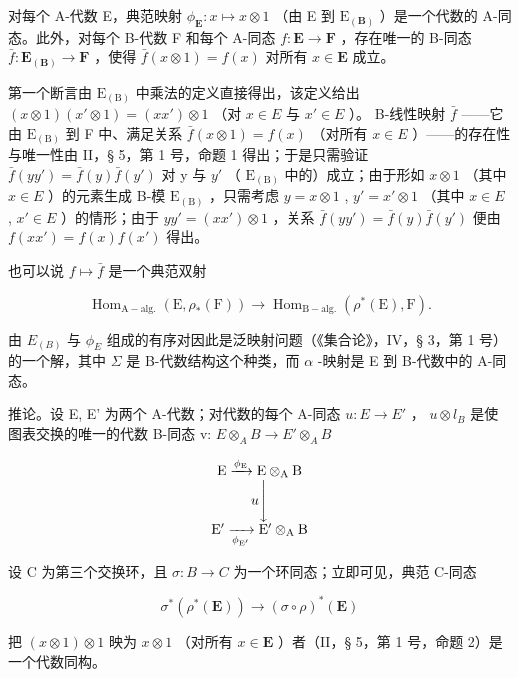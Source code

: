对每个 A-代数 E，典范映射 \(\phi_{\mathbf{E}}: x \mapsto x \otimes 1\) （由 E 到 \(\mathrm{E}_{(\mathbf{B})}\) ）是一个代数的 A-同态。此外，对每个 B-代数 F 和每个 A-同态 \(f: \mathbf{E} \to \mathbf{F}\) ，存在唯一的 B-同态 \(\bar{f}: \mathbf{E}_{(\mathbf{B})} \to \mathbf{F}\) ，使得 \(\bar{f}(x \otimes 1) = f(x)\) 对所有 \(x \in \mathbf{E}\) 成立。

第一个断言由 \(\mathrm{E}_{(\mathrm{B})}\) 中乘法的定义直接得出，该定义给出 \((x\otimes1)(x'\otimes1)=(xx')\otimes1\) （对 \(x\in E\) 与 \(x'\in E\) ）。 B-线性映射 \(\bar{f}\) ——它由 \(\mathrm{E}_{(\mathrm{B})}\) 到 F 中、满足关系 \(\bar{f}(x\otimes1)=f(x)\) （对所有 \(x\in E\) ）——的存在性与唯一性由 II，§ 5，第 1 号，命题 1 得出；于是只需验证 \(\bar{f}(yy')=\bar{f}(y)\bar{f}(y')\) 对 y 与 \(y'\) （ \(\mathrm{E}_{(\mathrm{B})}\) 中的）成立；由于形如 \(x\otimes1\) （其中 \(x\in E\) ）的元素生成 B-模 \(\mathrm{E}_{(\mathrm{B})}\) ，只需考虑 \(y=x\otimes1\) , \(y'=x'\otimes1\) （其中 \(x\in E\) , \(x'\in E\) ）的情形；由于 \(yy'=(xx')\otimes1\) ，关系 \(\bar{f}(yy')=\bar{f}(y)\bar{f}(y')\) 便由 \(f(xx')=f(x)f(x')\) 得出。

也可以说 \(f \mapsto \bar{f}\) 是一个典范双射

\[
\operatorname{Hom} _ {\mathrm{A-alg.}} (\mathrm{E}, \rho_ {*} (\mathrm{F})) \rightarrow \operatorname{Hom} _ {\mathrm{B-alg.}} (\rho^ {*} (\mathrm{E}), \mathrm{F}).\tag{6}
\]

由 \(E_{(B)}\) 与 \(\phi_{E}\) 组成的有序对因此是泛映射问题（《集合论》，IV，§ 3，第 1 号）的一个解，其中 \(\Sigma\) 是 B-代数结构这个种类，而 \(\alpha\) -映射是 E 到 B-代数中的 A-同态。

推论。设 E, E' 为两个 A-代数；对代数的每个 A-同态 \(u: E \to E'\) ， \(u \otimes l_{B}\) 是使图表交换的唯一的代数 B-同态 v: \(E \otimes_{A} B \to E' \otimes_{A} B\)

\[
\begin{array}{c} \mathrm{E} \xrightarrow {\phi_ {\mathrm{E}}} \mathrm{E} \otimes_ {\mathrm{A}} \mathrm{B} \\ u \Biggl \downarrow \\ \mathrm{E} ^ {\prime} \xrightarrow [ \phi_ {\mathrm{E} ^ {\prime}} ]{} \mathrm{E} ^ {\prime} \otimes_ {\mathrm{A}} \mathrm{B} \end{array}
\]

设 C 为第三个交换环，且 \(\sigma: B \to C\) 为一个环同态；立即可见，典范 C-同态

\[
\sigma^ {*} (\rho^ {*} (\mathbf {E})) \rightarrow (\sigma \circ \rho) ^ {*} (\mathbf {E})
\]

把 \((x\otimes 1)\otimes 1\) 映为 \(x\otimes 1\) （对所有 \(x\in \mathbf{E}\) ）者（II，§ 5，第 1 号，命题 2）是一个代数同构。


